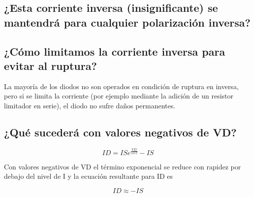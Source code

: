 \subsection{¿Esta corriente inversa (insignificante) se mantendrá para cualquier polarización inversa?}

\subsection{¿Cómo limitamos la corriente inversa para evitar al ruptura?}

La mayoría de los diodos no son operados en condición de ruptura en inversa, pero si se limita la corriente (por ejemplo mediante la adición de un resistor limitador en serie), el diodo no sufre daños permanentes.

\subsection{¿Qué sucederá con valores negativos de VD?}
\[
ID = ISe^{\frac{VD}{nVT}} - IS
\]

Con valores negativos de VD el término exponencial se reduce con rapidez por debajo del nivel de I y la ecuación resultante para ID es

\[
ID \approx -IS
\]

